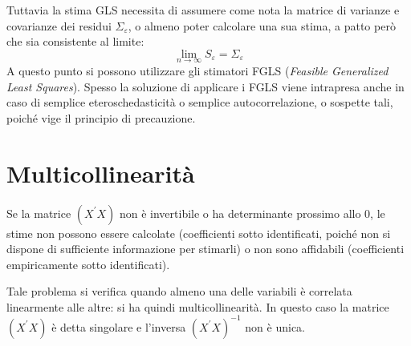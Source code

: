 \documentclass[a4page, 11pt]{article} %
\begin{document}
Tuttavia la stima GLS necessita di assumere come nota la matrice di varianze e covarianze dei residui $\Sigma_\varepsilon$, o almeno poter calcolare una sua stima, a patto però che sia consistente al limite:
\begin{equation*}
  \lim_{n\to \infty} S_\varepsilon = \Sigma_\varepsilon
\end{equation*}
A questo punto si possono utilizzare gli stimatori FGLS (\textit{Feasible Generalized Least Squares}).
Spesso la soluzione di applicare i FGLS viene intrapresa anche in caso di semplice eteroschedasticità o semplice autocorrelazione, o sospette tali, poiché vige il principio di precauzione.

\section{Multicollinearità }
Se la matrice $(X^\prime X)$ non è invertibile o ha determinante prossimo allo 0, le stime non possono essere calcolate (coefficienti sotto identificati, poiché non si dispone di sufficiente informazione per stimarli) o non sono affidabili (coefficienti empiricamente sotto identificati).

Tale problema si verifica quando almeno una delle variabili è correlata linearmente alle altre: si ha quindi multicollinearità.
In questo caso la matrice $(X^\prime X)$ è detta singolare e l'inversa $(X^\prime X)^{-1}$ non è unica. 
\end{document}
